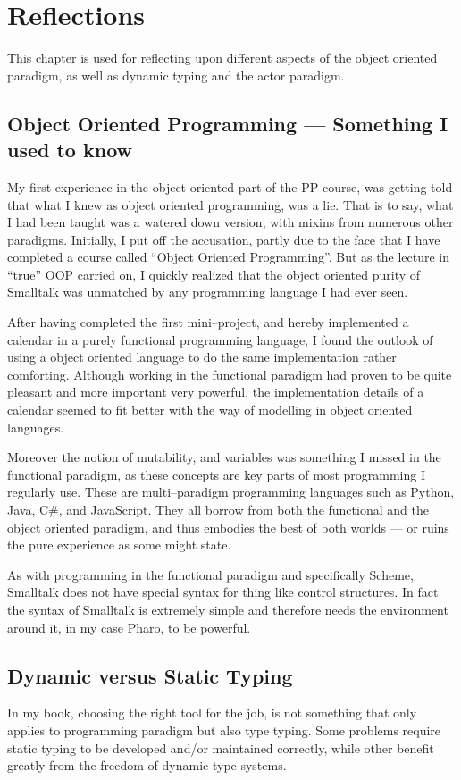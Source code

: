 \chapter{Reflections}
This chapter is used for reflecting upon different aspects of the object oriented paradigm, as well as dynamic typing and the actor paradigm.

\section{Object Oriented Programming --- Something I used to know}
My first experience in the object oriented part of the PP course, was getting told that what I knew as object oriented programming, was a lie.
That is to say, what I had been taught was a watered down version, with mixins from numerous other paradigms.
Initially, I put off the accusation, partly due to the face that I have completed a course called \enquote{Object Oriented Programming}.
But as the lecture in \enquote{true} OOP carried on, I quickly realized that the object oriented purity of Smalltalk was unmatched by any programming language I had ever seen.

\bigskip
After having completed the first mini--project, and hereby implemented a calendar in a purely functional programming language,
I found the outlook of using a object oriented language to do the same implementation rather comforting.
Although working in the functional paradigm had proven to be quite pleasant and more important very powerful,
the implementation details of a calendar seemed to fit better with the way of modelling in object oriented languages.

\bigskip
Moreover the notion of mutability, and variables was something I missed in the functional paradigm, as these concepts are key parts of most programming I regularly use.
These are multi--paradigm programming languages such as Python, Java, C\#, and JavaScript.
They all borrow from both the functional and the object oriented paradigm, and thus embodies the best of both worlds --- or ruins the pure experience as some might state.

\bigskip
As with programming in the functional paradigm and specifically Scheme, Smalltalk does not have special syntax for thing like control structures.
In fact the syntax of Smalltalk is extremely simple and therefore needs the environment around it, in my case Pharo, to be powerful.

\section{Dynamic versus Static Typing}
In my book, choosing the right tool for the job, is not something that only applies to programming paradigm but also type typing.
Some problems require static typing to be developed and/or maintained correctly, while other benefit greatly from the freedom of dynamic type systems.

